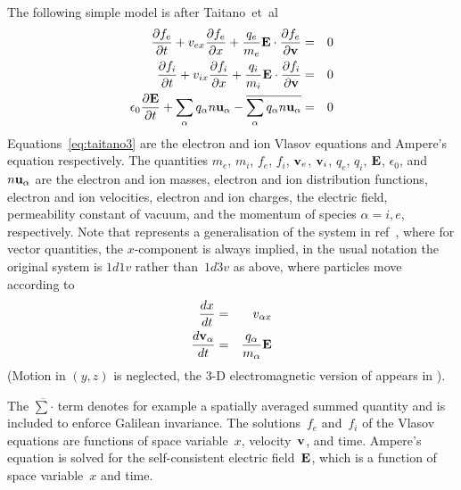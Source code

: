 The following simple model is after Taitano~et~al~\cite{Ta13Deve,Ch11Ener}
\begin{eqnarray}
\frac{\partial f_e}{\partial t} +  v_{ex}\frac{\partial f_e}{\partial  x} +  \frac{q_e}{m_e} {\bf E} \cdot \frac{\partial f_e}{\partial  {\bf v}} &=& 0 \nonumber \\
\frac{\partial f_i}{\partial t} +  v_{ix}\frac{\partial f_i}{\partial  x} +  \frac{q_i}{m_i} {\bf E} \cdot \frac{\partial f_i}{\partial  {\bf v}} &=& 0  \label{eq:taitano3} \\
\epsilon_0 \frac{\partial {\bf E}}{\partial t} + \sum_\alpha q_\alpha n {\bf u}_\alpha - \overline{\sum_\alpha q_\alpha n {\bf u}_\alpha} &=&0
\nonumber
\end{eqnarray}
Equations~\ref{eq:taitano3} are the electron and ion Vlasov equations and 
Ampere's equation respectively.
The quantities $m_e$, $m_i$, $f_e$, $f_i$, ${\bf v}_e$, ${\bf v}_i$,
$q_e$, $q_i$, ${\bf E}$, $\epsilon_0$, and~$n{\bf u}_\alpha$ are the
electron and ion masses, electron and ion distribution functions, electron and ion
velocities, electron and ion charges, the electric
field, permeability constant of vacuum, and the momentum of species $\alpha=i,e$, respectively.
Note that represents a generalisation of the system in ref~\cite{Ta13Deve},
where for vector quantities, the $x$-component is always implied, in the usual notation
the original system is $1d1v$ rather than~$1d3v$ as above, where particles move
according to
\begin{eqnarray}
\frac{dx}{dt} &=& v_{\alpha x} \nonumber \\
\frac{d {\bf v}_\alpha}{dt} &=& \frac{q_\alpha}{m_\alpha} {\bf E} \label{eq:xvtaitano}
\end{eqnarray}
(Motion in $(y,z)$ is neglected, the 3-D electromagnetic version of 
appears in ).

The $\overline{\sum \cdot}$ term denotes for example a spatially averaged summed
quantity and is included to enforce Galilean invariance. The solutions~$f_e$ and~$f_i$
of the Vlasov equations are functions of space variable~$x$, velocity~${\bf v}$, and time.
Ampere's equation is solved for the self-consistent electric field~${\bf E}$, which is a function of
space variable~$x$ and time.

